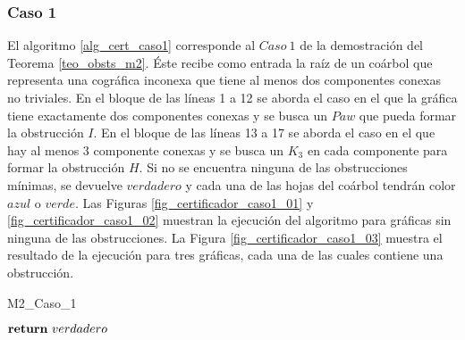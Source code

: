 \subsubsection{Caso 1}

El algoritmo \ref{alg_cert_caso1} corresponde al $Caso\ 1$ de la demostración del Teorema \ref{teo_obsts_m2}. Éste recibe como entrada la raíz de un coárbol que representa una cográfica inconexa que tiene al menos dos componentes conexas no triviales. En el bloque de las líneas 1 a 12 se aborda el caso en el que la gráfica tiene exactamente dos componentes conexas y se busca un $Paw$ que pueda formar la obstrucción $I$. En el bloque de las líneas 13 a 17 se aborda el caso en el que hay al menos 3 componente conexas y se busca un $K_3$ en cada componente para formar la obstrucción $H$. Si no se encuentra ninguna de las obstrucciones mínimas, se devuelve $verdadero$ y cada una de las hojas del coárbol tendrán color $azul$ o $verde$. Las Figuras \ref{fig_certificador_caso1_01} y \ref{fig_certificador_caso1_02} muestran la ejecución del algoritmo para gráficas sin ninguna de las obstrucciones. La Figura \ref{fig_certificador_caso1_03} muestra el resultado de la ejecución para tres gráficas, cada una de las cuales contiene una obstrucción.

\begin{algorithm}[!htbp]
\small
\caption{M2\_Caso\_1}
\label{alg_cert_caso1}

\DontPrintSemicolon %



$\Return\ verdadero$\;

\end{algorithm}


